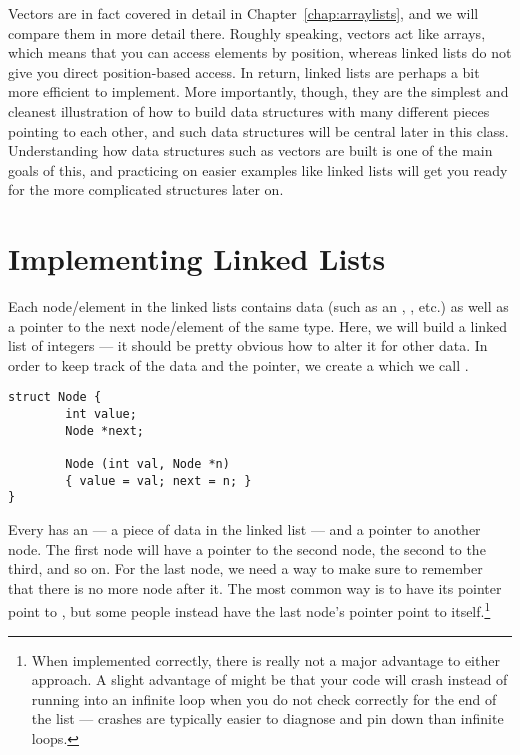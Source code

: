 Vectors are in fact covered in detail in
Chapter~\ref{chap:arraylists}, and we will compare them in more detail
there.
Roughly speaking, vectors act like arrays,
which means that you can access elements by position,
whereas linked lists do not give you direct position-based access.
In return, linked lists are perhaps a bit more efficient to implement.
More importantly, though, they are the simplest and cleanest
illustration of how to build data structures with many different
pieces pointing to each other,
and such data structures will be central later in this class.
Understanding how data structures such as vectors are built is one of
the main goals of this, and practicing on easier examples like linked
lists will get you ready for the more complicated structures later on.

\section{Implementing Linked Lists}
Each node/element in the linked lists contains data
(such as an , , etc.)
as well as a pointer to the next node/element of the same type. 
Here, we will build a linked list of integers
--- it should be pretty obvious how to alter it for other data.
In order to keep track of the data and the pointer,
we create a  which we call . 

\begin{verbatim}
struct Node {
        int value;
        Node *next;

        Node (int val, Node *n)
        { value = val; next = n; }
}
\end{verbatim}

Every  has an 
--- a piece of data in the linked list ---
and a pointer  to another node. 
The first node will have a pointer to the second node,
the second to the third, and so on. 
For the last node, we need a way to make sure to remember that there is
no more node after it.
The most common way is to have its  pointer point to ,
but some people instead have the last node's  pointer point
to itself.\footnote{When implemented correctly, there is really not a
  major advantage to either approach.
  A slight advantage of  might be that your code will
  crash instead of running into an infinite loop when you do not check
  correctly for the end of the list --- crashes are typically easier
  to diagnose and pin down than infinite loops.}

